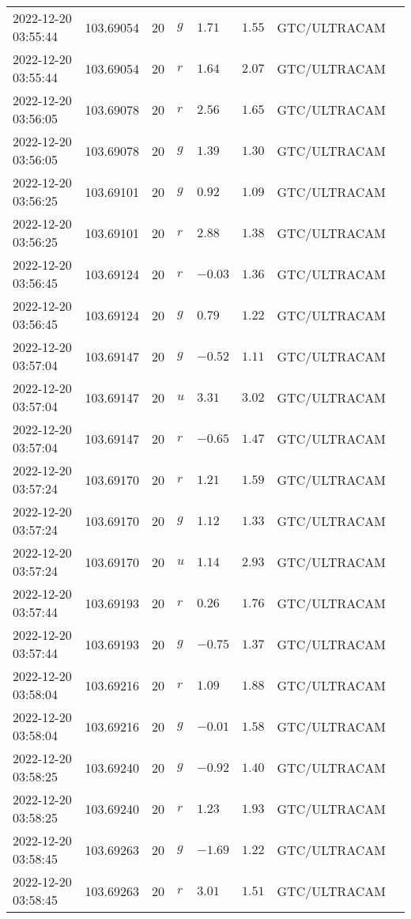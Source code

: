 \documentclass{nature_plusfigure}
\begin{document}
\begin{supplement}
\begin{center}
\begin{longtable}{llllllll}
2022-12-20 03:55:44 & 103.69054 & 20 & $g$ & $1.71$ & $1.55$ & GTC/ULTRACAM &  \\ 
2022-12-20 03:55:44 & 103.69054 & 20 & $r$ & $1.64$ & $2.07$ & GTC/ULTRACAM &  \\ 
2022-12-20 03:56:05 & 103.69078 & 20 & $r$ & $2.56$ & $1.65$ & GTC/ULTRACAM &  \\ 
2022-12-20 03:56:05 & 103.69078 & 20 & $g$ & $1.39$ & $1.30$ & GTC/ULTRACAM &  \\ 
2022-12-20 03:56:25 & 103.69101 & 20 & $g$ & $0.92$ & $1.09$ & GTC/ULTRACAM &  \\ 
2022-12-20 03:56:25 & 103.69101 & 20 & $r$ & $2.88$ & $1.38$ & GTC/ULTRACAM &  \\ 
2022-12-20 03:56:45 & 103.69124 & 20 & $r$ & $-0.03$ & $1.36$ & GTC/ULTRACAM &  \\ 
2022-12-20 03:56:45 & 103.69124 & 20 & $g$ & $0.79$ & $1.22$ & GTC/ULTRACAM &  \\ 
2022-12-20 03:57:04 & 103.69147 & 20 & $g$ & $-0.52$ & $1.11$ & GTC/ULTRACAM &  \\ 
2022-12-20 03:57:04 & 103.69147 & 20 & $u$ & $3.31$ & $3.02$ & GTC/ULTRACAM &  \\ 
2022-12-20 03:57:04 & 103.69147 & 20 & $r$ & $-0.65$ & $1.47$ & GTC/ULTRACAM &  \\ 
2022-12-20 03:57:24 & 103.69170 & 20 & $r$ & $1.21$ & $1.59$ & GTC/ULTRACAM &  \\ 
2022-12-20 03:57:24 & 103.69170 & 20 & $g$ & $1.12$ & $1.33$ & GTC/ULTRACAM &  \\ 
2022-12-20 03:57:24 & 103.69170 & 20 & $u$ & $1.14$ & $2.93$ & GTC/ULTRACAM &  \\ 
2022-12-20 03:57:44 & 103.69193 & 20 & $r$ & $0.26$ & $1.76$ & GTC/ULTRACAM &  \\ 
2022-12-20 03:57:44 & 103.69193 & 20 & $g$ & $-0.75$ & $1.37$ & GTC/ULTRACAM &  \\ 
2022-12-20 03:58:04 & 103.69216 & 20 & $r$ & $1.09$ & $1.88$ & GTC/ULTRACAM &  \\ 
2022-12-20 03:58:04 & 103.69216 & 20 & $g$ & $-0.01$ & $1.58$ & GTC/ULTRACAM &  \\ 
2022-12-20 03:58:25 & 103.69240 & 20 & $g$ & $-0.92$ & $1.40$ & GTC/ULTRACAM &  \\ 
2022-12-20 03:58:25 & 103.69240 & 20 & $r$ & $1.23$ & $1.93$ & GTC/ULTRACAM &  \\ 
2022-12-20 03:58:45 & 103.69263 & 20 & $g$ & $-1.69$ & $1.22$ & GTC/ULTRACAM &  \\ 
2022-12-20 03:58:45 & 103.69263 & 20 & $r$ & $3.01$ & $1.51$ & GTC/ULTRACAM &  \\ 

\end{longtable}
\end{center}
\end{supplement}
\end{document}
